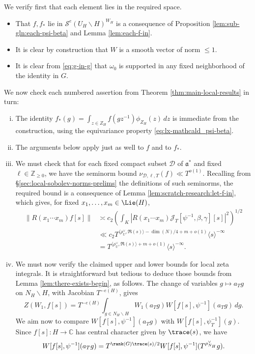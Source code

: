 We verify first that each element lies in the required space.
\begin{itemize}
\item That $f, f_{\ast}$ lie in $\mathcal{S}^e(U_H \backslash H)^{W_H}$ is a consequence of Proposition \ref{lem:sub-gln:each-psi-beta} and Lemma \ref{lem:each-f-in}.
\item It is clear by construction that $W$ is a smooth vector of norm $\leq 1$.
\item It is clear from \eqref{eq:g-in-g} that $\omega_0$ is supported in any fixed neighborhood of the identity in $G$.
\end{itemize}
We now check each numbered assertion from Theorem \ref{thm:main-local-results} in turn:
\begin{enumerate}[(i)]
\item The identity $f_{\ast}(g) = \int_{z \in Z_H} f(g z^{-1}) \phi_{Z_H}(z) \, d z$ is immediate from the construction, using the equivariance property \eqref{eq:lx-mathcald_psi-beta}.
\item The arguments below apply just as well to $f$ and to $f_{\ast}$.
\item We must check that for each fixed compact subset $\mathcal{D}$ of $\mathfrak{a}^*$ and fixed $\ell \in \mathbb{Z}_{\geq 0}$, we have the seminorm bound $\nu_{\mathcal{D},\ell,T}(f) \ll T^{o(1)}$.  Recalling from \S\ref{sec:local-sobolev-norms-prelims} the definitions of such seminorms, the required bound is a consequence of Lemma \ref{lem:scratch-research:let-f-in}, which gives, for fixed $x_1,\dotsc,x_m \in \Lie(H)$,
  \begin{align*}
    \|R(x_1 \dotsb x_m) f[s]\|
    &\asymp c_2 \left(\int_K \left\lvert R(x_1 \dotsb x_m) \mathcal{J}_T[\psi^{-1},\beta,\gamma][s] \right\rvert^2\right)^{1/2} \\
    &\ll c_2 T^{\langle \rho_U^\vee, \Re(s) \rangle - \dim(N)/4 + m +  o(1)} \langle s \rangle^{-\infty} \\
    &= T^{\langle \rho_U^\vee, \Re(s) \rangle + m + o(1)} \langle s \rangle^{-\infty}.
  \end{align*}
\item We must now verify the claimed upper and lower bounds for local zeta integrals.  It is straightforward but tedious to deduce those bounds from Lemma \ref{lem:there-exists-begin}, as follows.  The change of variables $g \mapsto a_T g$ on $N_H \backslash H$, with Jacobian $T^{-e(H)}$, gives
  \begin{equation*}
    Z(W_1, f[s]) = T^{-e(H)} \int_{g \in N_H \backslash H} W_1(a_T g) W[f[s], \psi^{-1}](a_T g) \, d g.
  \end{equation*}
  We aim now to compare $W[f[s], \psi^{-1}](a_T g)$ with $W[f[s], \psi_T^{-1}](g)$.
  Since $f[s] : H \rightarrow \mathbb{C}$ has central character given by $\trace(s)$, we have
  \begin{equation*}
    W[f[s], \psi^{-1}](a_T g) = T^{\rank(G) \trace(s)/2} W[f[s], \psi^{-1}](T^{\rho_{N_H}^\vee} g).
  \end{equation*}


\end{enumerate}
